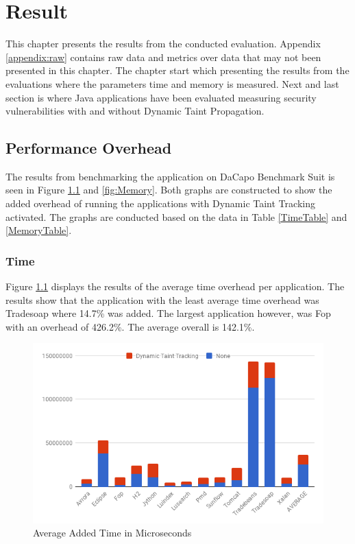 \chapter{Result}
This chapter presents the results from the conducted evaluation. Appendix \ref{appendix:raw} contains raw data and metrics over data that may not been presented in this chapter. The chapter start which presenting the results from the \textit{} evaluations where the parameters time and memory is measured. Next and last section is \textit{} where Java applications have been evaluated measuring security vulnerabilities with and without Dynamic Taint Propagation.



\section{Performance Overhead}
\label{Performance}
The results from benchmarking the application on DaCapo Benchmark Suit \parencite{dacapo} is seen in Figure \ref{fig:Time} and \ref{fig:Memory}. Both graphs are constructed to show the added overhead of running the applications with Dynamic Taint Tracking activated. The graphs are conducted based on the data in Table \ref{TimeTable} and \ref{MemoryTable}.



\subsection{Time}
Figure \ref{fig:Time} displays the results of the average time overhead per application. The results show that the application with the least average time overhead was Tradesoap where 14.7\% was added. The largest application however, was Fop with an overhead of 426.2\%. The average overall is 142.1\%.

\begin{figure}[!hbt]
	\centering
	\includegraphics[width=\textwidth]{images/Time.png}
	\caption{Average Added Time in Microseconds}
	\label{fig:Time}
\end{figure}



